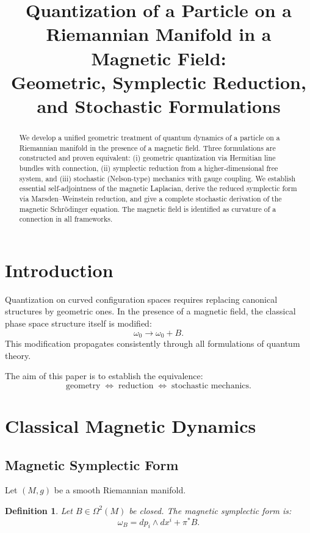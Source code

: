 \documentclass[11pt]{article}
\title{\textbf{Quantization of a Particle on a Riemannian Manifold in a Magnetic Field:\\
Geometric, Symplectic Reduction, and Stochastic Formulations}}
\author{}
\date{}
\newtheorem{definition}[theorem]{Definition}
\begin{document}
\maketitle

\begin{abstract}
We develop a unified geometric treatment of quantum dynamics of a particle on a Riemannian manifold in the presence of a magnetic field. Three formulations are constructed and proven equivalent: (i) geometric quantization via Hermitian line bundles with connection, (ii) symplectic reduction from a higher-dimensional free system, and (iii) stochastic (Nelson-type) mechanics with gauge coupling. We establish essential self-adjointness of the magnetic Laplacian, derive the reduced symplectic form via Marsden--Weinstein reduction, and give a complete stochastic derivation of the magnetic Schr\"odinger equation. The magnetic field is identified as curvature of a connection in all frameworks.
\end{abstract}

\tableofcontents

\section{Introduction}

Quantization on curved configuration spaces requires replacing canonical structures by geometric ones. In the presence of a magnetic field, the classical phase space structure itself is modified:
\[
\omega_0 \to \omega_0 + B.
\]
This modification propagates consistently through all formulations of quantum theory.

The aim of this paper is to establish the equivalence:
\[
\text{geometry} \;\Longleftrightarrow\; \text{reduction} \;\Longleftrightarrow\; \text{stochastic mechanics}.
\]

\section{Classical Magnetic Dynamics}

\subsection{Magnetic Symplectic Form}

Let $(M,g)$ be a smooth Riemannian manifold.

\begin{definition}
Let $B \in \Omega^2(M)$ be closed. The magnetic symplectic form is:
\[
\omega_B = dp_i \wedge dx^i + \pi^* B.
\]
\end{definition}
\end{document}
